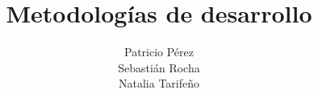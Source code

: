 \documentclass[a4paper,11pt]{report}
\begin{document}
\title{Metodologías de desarrollo}
\author{Patricio Pérez\\
        Sebastián Rocha\\
        Natalia Tarifeño}
\maketitle
\tableofcontents

\end{document}
